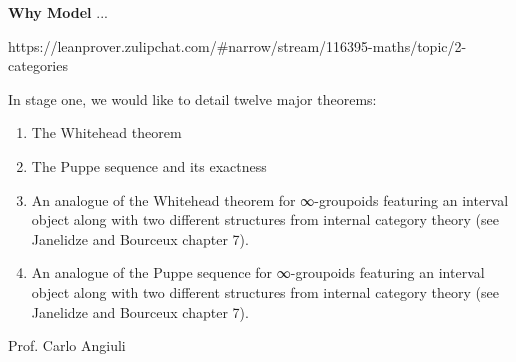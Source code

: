 \documentclass{book}
\begin{document}
{\bf Why Model} ...

https://leanprover.zulipchat.com/#narrow/stream/116395-maths/topic/2-categories

In stage one, we would like to detail twelve major theorems:

\begin{enumerate}
\item The Whitehead theorem
\item The Puppe sequence and its exactness
\item An analogue of the Whitehead theorem for ∞-groupoids featuring an interval object along with two different structures from internal category theory (see Janelidze and Bourceux chapter 7).
\item An analogue of the Puppe sequence for ∞-groupoids featuring an interval object along with two different structures from internal category theory (see Janelidze and Bourceux chapter 7).
\end{enumerate}


Prof. Carlo Angiuli
\fi
\end{document}
